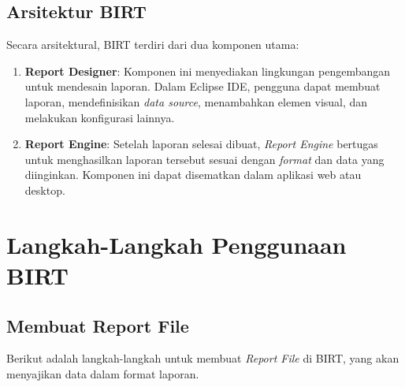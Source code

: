 \subsection{Arsitektur BIRT}

Secara arsitektural, BIRT terdiri dari dua komponen utama:

\begin{enumerate}
	\item \textbf{Report Designer}: Komponen ini menyediakan lingkungan pengembangan untuk mendesain laporan. Dalam Eclipse IDE, pengguna dapat membuat laporan, mendefinisikan \textit{data source}, menambahkan elemen visual, dan melakukan konfigurasi lainnya.
	\item \textbf{Report Engine}: Setelah laporan selesai dibuat, \textit{Report Engine} bertugas untuk menghasilkan laporan tersebut sesuai dengan \textit{format} dan data yang diinginkan. Komponen ini dapat disematkan dalam aplikasi web atau desktop.
\end{enumerate}

\section{Langkah-Langkah Penggunaan BIRT}

\subsection{Membuat Report File}

Berikut adalah langkah-langkah untuk membuat \textit{Report File} di BIRT, yang akan menyajikan data dalam format laporan.


